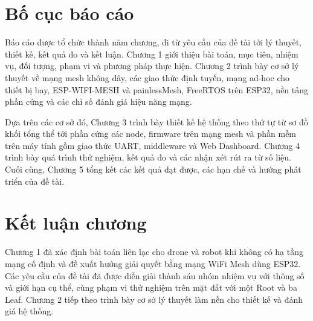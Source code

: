 \section{Bố cục báo cáo}\label{sec:1.6}

Báo cáo được tổ chức thành năm chương, đi từ yêu cầu của đề tài tới lý thuyết, thiết kế, kết quả đo và kết luận. Chương 1 giới thiệu bài toán, mục tiêu, nhiệm vụ, đối tượng, phạm vi và phương pháp thực hiện. Chương 2 trình bày cơ sở lý thuyết về mạng mesh không dây, các giao thức định tuyến, mạng ad-hoc cho thiết bị bay, ESP-WIFI-MESH và painlessMesh, FreeRTOS trên ESP32, nền tảng phần cứng và các chỉ số đánh giá hiệu năng mạng.

Dựa trên các cơ sở đó, Chương 3 trình bày thiết kế hệ thống theo thứ tự từ sơ đồ khối tổng thể tới phần cứng các node, firmware trên mạng mesh và phần mềm trên máy tính gồm giao thức UART, middleware và Web Dashboard. Chương 4 trình bày quá trình thử nghiệm, kết quả đo và các nhận xét rút ra từ số liệu. Cuối cùng, Chương 5 tổng kết các kết quả đạt được, các hạn chế và hướng phát triển của đề tài.


\section{Kết luận chương}

Chương 1 đã xác định bài toán liên lạc cho drone và robot khi không có hạ tầng mạng cố định và đề xuất hướng giải quyết bằng mạng WiFi Mesh dùng ESP32. Các yêu cầu của đề tài đã được diễn giải thành sáu nhóm nhiệm vụ với thông số và giới hạn cụ thể, cùng phạm vi thử nghiệm trên mặt đất với một Root và ba Leaf. Chương 2 tiếp theo trình bày cơ sở lý thuyết làm nền cho thiết kế và đánh giá hệ thống.
